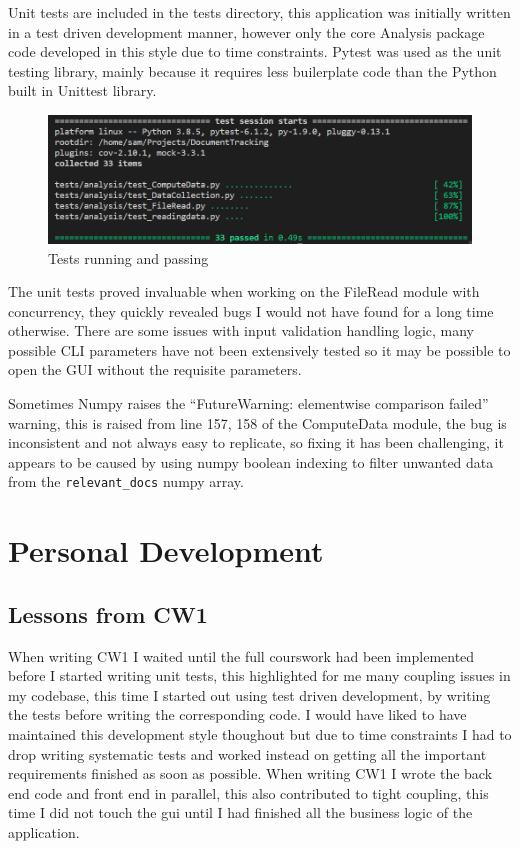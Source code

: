 \documentclass[11pt]{article}
\newcommand{\code}[1]{\colorbox{light-gray}{\texttt{#1}}}
\begin{document}
Unit tests are included in the tests directory, this application was initially written in a test driven development manner, however only the core Analysis package code developed in this style due to time constraints. Pytest was used as the unit testing library, mainly because it requires less builerplate code than the Python built in Unittest library.

\begin{figure}[h]
    \includegraphics{pytest.png}
    \caption{Tests running and passing}
    \label{fig:pytest}
\end{figure}

The unit tests proved invaluable when working on the FileRead module with concurrency, they quickly revealed bugs I would not have found for a long time otherwise.
There are some issues with input validation handling logic, many possible CLI parameters have not been extensively tested so it may be possible to open the GUI without the requisite parameters. 

Sometimes Numpy raises the ``FutureWarning: elementwise comparison failed'' warning, this is raised from line 157, 158 of the ComputeData module, the bug is inconsistent and not always easy to replicate, so fixing it has been challenging, it appears to be caused by using numpy boolean indexing to filter unwanted data from the \code{relevant\_docs} numpy array.

\section{Personal Development}
\subsection{Lessons from CW1}
When writing CW1 I waited until the full courswork had been implemented before I started writing unit tests, this highlighted for me many coupling issues in my codebase, this time I started out using test driven development, by writing the tests before writing the corresponding code.
I would have liked to have maintained this development style thoughout but due to time constraints I had to drop writing systematic tests and worked instead on getting all the important requirements finished as soon as possible.
When writing CW1 I wrote the back end code and front end in parallel, this also contributed to tight coupling, this time I did not touch the gui until I had finished all the business logic of the application.
\end{document}
